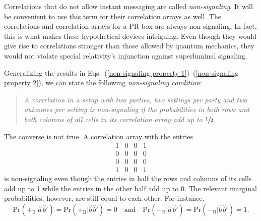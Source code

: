 Correlations that do not allow instant messaging are called \emph{non-signaling}. It will be convenient to use this term for their correlation arrays as well. The correlations and correlation arrays for a PR box are always non-signaling. In fact, this is what makes these hypothetical devices intriguing. Even though they would give rise to correlations stronger than those allowed by quantum mechanics, they would not violate special relativity's injunction against superluminal signaling.

Generalizing the results in Eqs.\ (\ref{non-signaling property 1})--(\ref{non-signaling property 2}), we can state the following \emph{non-signaling condition}:
\begin{quote}
\emph{A correlation in a setup with two parties, two settings per party and two outcomes per setting is \emph{non-signaling} if the probabilities in both rows and both columns of all cells in its correlation array add up to $\sfrac12$.}
\end{quote}
The converse is not true. A correlation array with the entries
\begin{equation}
\begin{array}{cccc}
1  & 0  & 0 & 1 \\[.1 cm]
 0 & 0  & 0 & 0 \\[.1 cm]
 0 & 0  & 0 & 0 \\[.1 cm]
1 & 0 & 0 & 1
\end{array}
\end{equation}
is non-signaling even though the entries in half the rows and columns of its cells add up to 1 while the entries in the other half add up to 0. The relevant marginal probabilities, however, are still equal to each other. For instance,
\begin{equation}
\mathrm{Pr}(+_{\mathrm B}|\hat{a} \,\hat{b}') = \mathrm{Pr}(+_{\mathrm B}|\hat{b} \,\hat{b}') = 0 \quad \mathrm{ and} \quad \mathrm{Pr}(-_{\mathrm B}|\hat{a} \,\hat{b}') = \mathrm{Pr}(-_{\mathrm B}|\hat{b} \,\hat{b}') = 1.
\end{equation}
